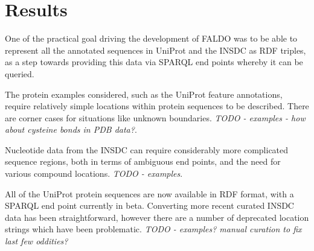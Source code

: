 \section*{Results}
One of the practical goal driving the development of FALDO was to be able
to represent all the annotated sequences in UniProt and the INSDC as RDF
triples, as a step towards providing this data via SPARQL end points whereby
it can be queried.

The protein examples considered, such as the UniProt feature annotations,
require relatively simple locations within protein sequences to be described.
There are corner cases for situations like unknown boundaries.
\textit{TODO - examples - how about cysteine bonds in PDB data?}.

Nucleotide data from the INSDC can require considerably more complicated
sequence regions, both in terms of ambiguous end points, and the need for
various compound locations.
\textit{TODO - examples}.

All of the UniProt protein sequences are now available in RDF format,
with a SPARQL end point currently in beta. Converting more recent
curated INSDC data has been straightforward, however there are a
number of deprecated location strings which have been problematic.
\textit{TODO - examples? manual curation to fix last few oddities?}
